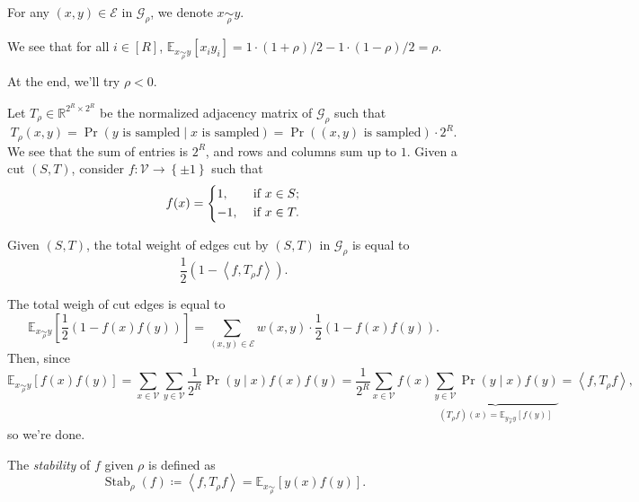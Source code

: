 \begin{notation}
	For any \((x, y)\in \mathcal{E} \) in \(\mathcal{G} _\rho \), we denote \(x \underset{\rho }{\sim } y\).
\end{notation}

We see that for all \(i\in [R]\), \(\mathbb{E}_{x \underset{\rho }{\sim }y }\left[x_i y_i \right] = 1\cdot (1+\rho )/2 - 1\cdot (1 - \rho ) / 2 = \rho \).

\begin{note}
	At the end, we'll try \(\rho < 0\).
\end{note}

Let \(T_\rho \in \mathbb{R} ^{2^R \times 2^R}\) be the normalized adjacency matrix of \(\mathcal{G} _\rho \) such that
\[
	T_{\rho } (x, y)
	= \Pr_{}(\text{\(y\) is sampled} \mid \text{\(x\) is sampled} )
	= \Pr_{}(\text{\((x, y)\) is sampled} ) \cdot 2^R.
\]
We see that the sum of entries is \(2^R\), and rows and columns sum up to \(1\). Given a cut \((S, T)\), consider \(f\colon \mathcal{V} \to \left\{ \pm 1 \right\} \) such that
\[
	f(x) = \begin{dcases}
		1,  & \text{ if } x\in S ; \\
		-1, & \text{ if } x\in T .
	\end{dcases}
\]

\begin{claim}
	Given \((S, T)\), the total weight of edges cut by \((S, T)\) in \(\mathcal{G} _{\rho }\) is equal to
	\[
		\frac{1}{2} (1 - \left\langle f, T_\rho f \right\rangle ).
	\]
\end{claim}
\begin{explanation}
	The total weigh of cut edges is equal to
	\[
		\mathbb{E}_{x \underset{\rho }{\sim }y }\left[ \frac{1}{2} (1 - f(x) f(y)) \right]
		= \sum_{(x, y)\in \mathcal{E} } w(x, y)\cdot \frac{1}{2}(1 - f(x) f(y)).
	\]
	Then, since
	\[
		\mathbb{E}_{x \underset{\rho }{\sim } y}\left[f(x) f(y) \right]
		= \sum_{x\in \mathcal{V} } \sum_{y\in \mathcal{V} } \frac{1}{2^R} \Pr_{}(y\mid x) f(x) f(y)
		= \frac{1}{2^R} \sum_{x\in \mathcal{V} } f(x) \underbrace{\sum_{y\in \mathcal{V} } \Pr_{}(y\mid x) f(y)}_{(T_\rho f)(x) = \mathbb{E}_{y \underset{\rho }{\sim } y}\left[ f(y)\right] }
		= \left\langle f, T_{\rho } f \right\rangle,
	\]
	so we're done.
\end{explanation}

\begin{definition}[Stability]\label{def:stability}
	The \emph{stability} of \(f\) given \(\rho \) is defined as
	\[
		\mathop{\mathrm{Stab}}_\rho (f) \coloneqq \left\langle f, T_\rho f \right\rangle = \mathbb{E}_{x \underset{\rho }{\sim } }\left[y(x)f(y) \right].
	\]
\end{definition}

